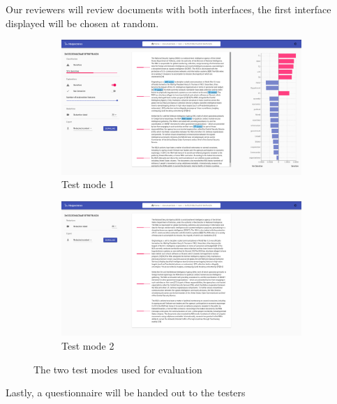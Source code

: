 \documentclass{l4proj}
\begin{document}
Our reviewers will review documents with both interfaces, the first interface displayed will be chosen at random.


\begin{figure}[H]
    \centering
    \begin{subfigure}[b]{0.7\textwidth}
        \centering
        \includegraphics[width=\linewidth]{images/ui_test_mode_1.png}
        \caption{Test mode 1}
        \label{fig:test_mode_1}
    \end{subfigure}
    
    
    \begin{subfigure}[b]{0.7\textwidth}
        \centering
        \includegraphics[width=\linewidth]{images/ui_test_mode_2.png}
        \caption{Test mode 2}
        \label{fig:test_mode_2}
    \end{subfigure}
    \caption{The two test modes used for evaluation}
    \label{fig:test_modes}
\end{figure}

Lastly, a questionnaire will be handed out to the testers
\end{document}
